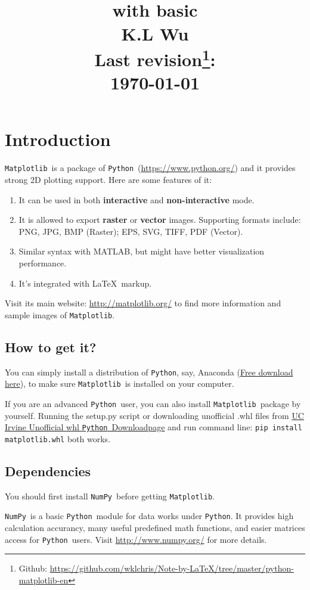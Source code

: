 \documentclass{report}
\title{\flushright\framebox{\Huge Simple \mpl} \\[0.4ex]
with basic \NumPy \\[2.5ex]
\ttfamily K.L Wu \\[4ex]
\rmfamily\fontsize{12}{18}\selectfont
Last revision\footnote{Github: \url{https://github.com/wklchris/Note-by-LaTeX/tree/master/python-matplotlib-en}}: \\
\today
}
\author{}
\date{}
\newcommand{\pkg}[1]{\texttt{#1}}
\newcommand{\Py}{\pkg{Python}}
\newcommand{\NumPy}{\pkg{NumPy}}
\newcommand{\mpl}{\texttt{Matplotlib}}
\newcommand{\Emph}[1]{\textcolor{cyan!80!white}{{\bfseries #1}}}
\begin{document}
\maketitle

\tableofcontents

\listoffigures

\chapter{Introduction}
\mpl\ is a package of \Py\ (\url{https://www.python.org/}) and it provides strong 2D plotting support. Here are some features of it:
\begin{enumerate}
\item It can be used in both \Emph{interactive} and \Emph{non-interactive} mode.
\item It is allowed to export \Emph{raster} or \Emph{vector} images. Supporting formats include: PNG, JPG, BMP (Raster); EPS, SVG, TIFF, PDF (Vector).
\item Similar syntax with MATLAB, but might have better visualization performance.
\item It's integrated with \LaTeX\ markup.
\end{enumerate}

Visit its main website: \url{http://matplotlib.org/} to find more information and sample images of \mpl .

\section{How to get it?}
You can simply install a distribution of \Py, say, Anaconda (\href{https://www.continuum.io/downloads}{Free download here}), to make sure \mpl\ is installed on your computer. 

If you are an advanced \Py\ user, you can also install \mpl\ package by yourself. Running the setup.py script or downloading unofficial .whl files from \href{http://www.lfd.uci.edu/~gohlke/pythonlibs/#matplotlib}{UC Irvine Unofficial whl \Py\ Downloadpage} and run command line: \texttt{pip install matplotlib.whl} both works.

\section{Dependencies}
You should first install \NumPy\ before getting \mpl .

\NumPy\ is a basic \Py\ module for data works under \Py . It provides high calculation accurancy, many useful predefined math functions, and easier matrices access for \Py\ users. Visit \url{http://www.numpy.org/} for more details.
\end{document}
